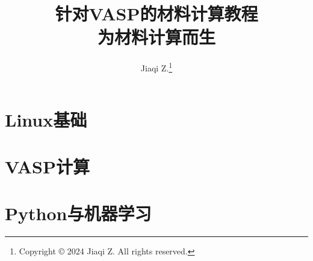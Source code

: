 \documentclass{book}
\title{针对VASP的材料计算教程\\为材料计算而生}
\author{Jiaqi Z.\footnote{Copyright © 2024 Jiaqi Z. All rights reserved.}}
\begin{document}
    \maketitle

    \frontmatter

    \dominitoc

    \tableofcontents

    

    

    \mainmatter

    \part{Linux基础}

    

    \part{VASP计算}

    

    \part{Python与机器学习}

    

    \backmatter

    \printindex

    
\end{document}
